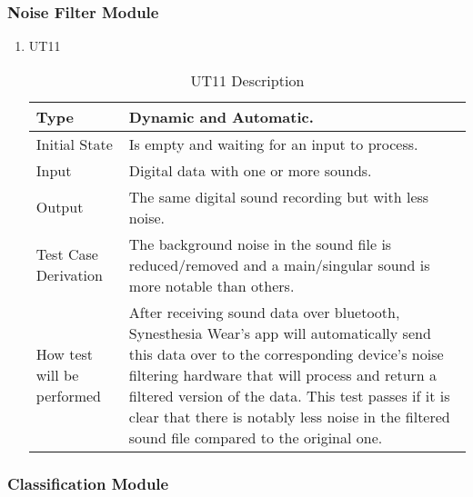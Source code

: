 \documentclass[12pt, titlepage]{article}
\begin{document}
\subsubsection{Noise Filter Module}

\begin{enumerate}

\item{UT11}
\begin{table}[H]
    \caption{UT11 Description}
\begin{tabular}{ |p{5cm}||p{7cm}| }
    \hline
    Type & Dynamic and Automatic. \\
    \hline
    Initial State  &  Is empty and waiting for an input to process. \\
    \hline
    Input &   Digital data with one or more sounds. \\
    \hline
    Output &   The same digital sound recording but with less noise.  \\
    \hline
    Test Case Derivation &   The background noise in the sound file is reduced/removed and a main/singular sound is more notable than others. \\
    \hline
    How test will be performed & After receiving sound data over bluetooth, Synesthesia Wear’s app will automatically send this data over to the corresponding device’s noise filtering hardware that will process and return a filtered version of the data. This test passes if it is clear that there is notably less noise in the filtered sound file compared to the original one. \\
    \hline
\end{tabular}
\end{table}
\end{enumerate}


\subsubsection{Classification Module}
\end{document}
